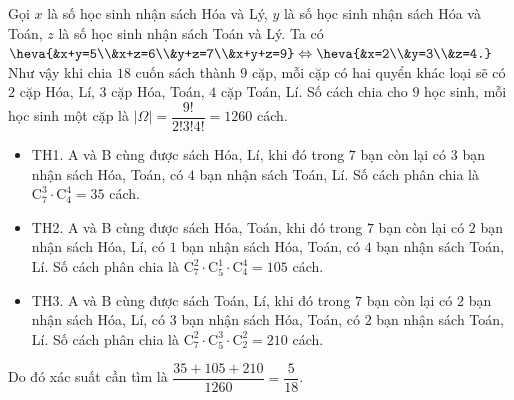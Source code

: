 \begin{vd}
{\begin{tongquat}
			
		\end{tongquat}
		\noindent
		Gọi $x$ là số học sinh nhận sách Hóa và Lý, $y$ là số học sinh nhận sách Hóa và Toán, $z$ là số học sinh nhận sách Toán và Lý. Ta có $\heva{&x+y=5\\&x+z=6\\&y+z=7\\&x+y+z=9} \Leftrightarrow \heva{&x=2\\&y=3\\&z=4.}$\\
		Như vậy khi chia $18$ cuốn sách thành $9$ cặp, mỗi cặp có hai quyển khác loại sẽ có $2$ cặp Hóa, Lí, $3$ cặp Hóa, Toán, $4$ cặp Toán, Lí. Số cách chia cho $9$ học sinh, mỗi học sinh một cặp là $|\Omega| = \dfrac{9!}{2!3!4!} = 1260$ cách.\\
		\begin{itemize}
			\item TH1. A và B cùng được sách Hóa, Lí, khi đó trong $7$ bạn còn lại có $3$ bạn nhận sách Hóa, Toán, có $4$ bạn nhận sách Toán, Lí. Số cách phân chia là $\mathrm{C}_7^3 \cdot \mathrm{C}_4^4 = 35$ cách.
			\item TH2. A và B cùng được sách Hóa, Toán, khi đó trong $7$ bạn còn lại có $2$ bạn nhận sách Hóa, Lí, có $1$ bạn nhận sách Hóa, Toán, có $4$ bạn nhận sách Toán, Lí. Số cách phân chia là $\mathrm{C}_7^2 \cdot \mathrm{C}_5^1 \cdot \mathrm{C}_4^4 = 105$ cách.
			\item TH3. A và B cùng được sách Toán, Lí, khi đó trong $7$ bạn còn lại có $2$ bạn nhận sách Hóa, Lí, có $3$ bạn nhận sách Hóa, Toán, có $2$ bạn nhận sách Toán, Lí. Số cách phân chia là $\mathrm{C}_7^2 \cdot \mathrm{C}_5^3 \cdot \mathrm{C}_2^2 = 210$ cách.
		\end{itemize} 
		Do đó xác suất cần tìm là $\dfrac{35+105+210}{1260}=\dfrac{5}{18}$.
	}
\end{vd}



